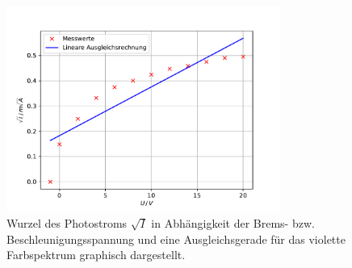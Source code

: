 \begin{figure}
  \centering
  \includegraphics[width=0.8\textwidth]{content/data/violett.pdf}
  \caption{Wurzel des Photostroms $\sqrt{I}$ in Abhängigkeit der Brems- bzw. Beschleunigungsspannung und eine Ausgleichsgerade für das violette Farbspektrum graphisch dargestellt. \cite{matplotlib}\cite{scipy}\cite{numpy}}
  \label{fig:violett}
\end{figure}

